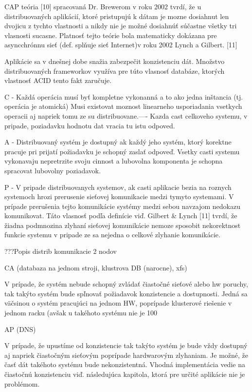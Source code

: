 \documentclass[11pt,twoside,a4paper]{book}
\begin{document}
CAP teória [10] spracovaná Dr. Brewerom v roku 2002 tvrdí, že u distribuovaných aplikácií, ktoré pristupujú k dátam je mozne dosiahnut len dvojicu z tychto vlastnosti a nikdy nie je možné dosiahnúť súčastne všetky tri vlasnosti sucasne. Platnosť tejto teórie bola matematicky dokázana pre asyncchrónnu sieť (def. splňuje sieť Internet)v roku 2002 Lynch a Gilbert. [11]

Aplikácie sa v dnešnej dobe snažia zabezpečit konzistenciu dát. Množstvo distribuovaných frameworkov využíva pre túto vlasnosť databáze, ktorých vlastnosť ACID tento fakt zaručuje.

C - Každá operácia musí byť kompletne vykonanná a to ako jedna inštancia (tj. operácia je atomická) Musi existovat moznost linearneho usporiadania vsetkych operacii aj napriek tomu ze su distribuovane.---- Kazda cast celkoveho systemu, v pripade, poziadavku hodnotu dat vracia tu istu odpoved.

A - Distribuovaný systém je dostupný ak každý jeho systém, ktorý korektne pracuje pri prijatí požiadavku je schopný zaslať odpoveď. Vsetky casti systemu vykonavaju nepretrzite svoju cinnost a lubovolna komponenta je schopna spracovat lubovolny poziadavok.

P - V pripade distribuovanych systemov, ak casti aplikacie bezia na roznych systemoch hrozi prerusenie sieťovej komunikacie medzi tymyto systemami. V prípade prerušenia tejto komunikácie systémy medzi sebou navzajom nedokazu komunikovat. Táto vlasnosť podľa definície viď. Gilbert & Lynch [11] tvrdí, že žiadna podmnozina zlyhaní sieťovej komunikácie nemoze sposobit nekorektnost funkcie systemu v pripade ze sa nejedna o celkové zlyhanie komunikácie.  

???Popis distrib komunikacie 2 nodov

CA (databaza na jednom stroji, klustrova DB (narocne), xfs)

V prípade, že systém nebude schopný zvládať čiastočné sieťové alebo hw poruchy, tak takýto systém bude spľnovať požiadavok konzistencie a dostupnosti. Jedná sa väčsinou o systém pracujúci na jednom HW, poprípade klusterové riešenie v jednom racku (avšak u takéhoto systému nie je 100%

AP (DNS)

V prípade, že upustíme od konzistencie tak takýto systém je bude vždy dostupný aj napriek čiastočným sieťovým poprípade hardwarovým zlyhaniam. Je možné, že časť dát takéhoto systému bude nekonzistentná. Vhodná implementácia vedie na čiastočnú konzistenciu viď. následujúca kapitola, ktorá pre určité aplikácie nie je problémom.
\end{document}
